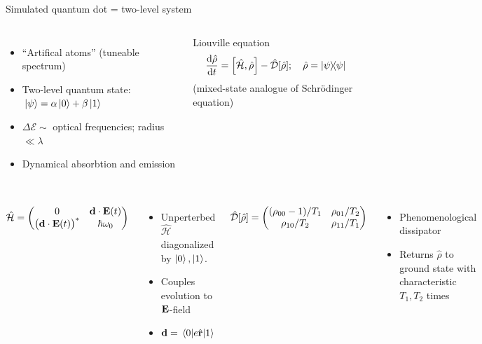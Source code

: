 \documentclass[aspectratio=169]{beamer}
\begin{document}
\begin{frame}{Simulated quantum dot = two-level system}
  \begin{columns}[c]
      \centering
      

      \begin{itemize}
        \item ``Artifical atoms'' (tuneable spectrum)
        \item Two-level quantum state: $\ket*{\psi} = \alpha \ket{0} + \beta \ket{1}$
        \item $\Delta \mathcal{E} \sim$ optical frequencies; radius $\ll \lambda$
        \item Dynamical absorbtion and emission
      \end{itemize}

      \begin{block}{Liouville equation}
        \begin{equation*}
          \dv{\hat{\rho}}{t} = \commutator{\hat{\mathcal{H}}}{\hat{\rho}} - \hat{\mathcal{D}}\qty[\hat{\rho}]; \quad \hat{\rho} = \dyad{\psi}{\psi}
        \end{equation*}
        \hfill {\tiny(mixed-state analogue of Schr\"odinger equation)}
      \end{block}
  \end{columns}
\end{frame}

\begin{frame}
  \begin{columns}
      \begin{equation*}
        \hat{\mathcal{H}} = \mqty(0 & \vb{d} \cdot \vb{E}(t) \\ \qty\big(\vb{d} \cdot \vb{E}(t))^* & \hbar \omega_0)
      \end{equation*}
      \begin{itemize}
        \item Unperterbed $\hat{\mathcal{H}}$ diagonalized by $\ket{0}, \ket{1}$.
        \item Couples evolution to $\vb{E}$-field
        \item $\vb{d} = \matrixelement{0}{e \hat{\vb{r}}}{1}$
      \end{itemize}

      \begin{equation*}
        \hat{\mathcal{D}}\qty[\hat{\rho}] = \mqty((\rho_{00} - 1)/T_1 & \rho_{01}/T_2 \\ \rho_{10}/T_2 & \rho_{11}/T_1)
      \end{equation*}
      \begin{itemize}
        \item Phenomenological dissipator
        \item Returns $\hat{\rho}$ to ground state with characteristic $T_1, T_2$ times
      \end{itemize}
  \end{columns}
\end{frame}
\end{document}
